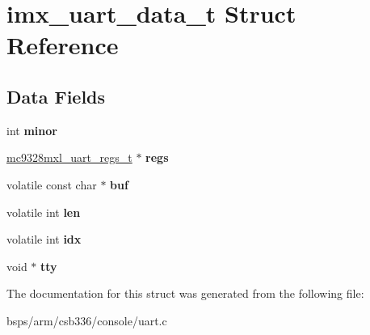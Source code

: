 \hypertarget{structimx__uart__data__t}{}\section{imx\+\_\+uart\+\_\+data\+\_\+t Struct Reference}
\label{structimx__uart__data__t}
\subsection*{Data Fields}
\begin{DoxyCompactItemize}
\item 
\mbox{\label{structimx__uart__data__t_a5329b57ac930b124fdaf34b22572b4e4}} 
int {\bfseries minor}
\item 
\mbox{\label{structimx__uart__data__t_a13bff1061bfa4ee0696477ef9d562e70}} 
\mbox{\hyperlink{structmc9328mxl__uart__regs__t}{mc9328mxl\+\_\+uart\+\_\+regs\+\_\+t}} $\ast$ {\bfseries regs}
\item 
\mbox{\label{structimx__uart__data__t_af8541799d7591bd41c897a14ad0b21ae}} 
volatile const char $\ast$ {\bfseries buf}
\item 
\mbox{\label{structimx__uart__data__t_a7ae7f01abf1b3db5e89b8d3aae6e1abd}} 
volatile int {\bfseries len}
\item 
\mbox{\label{structimx__uart__data__t_a4f73e22f69dd97d075631262f2da3dbd}} 
volatile int {\bfseries idx}
\item 
\mbox{\label{structimx__uart__data__t_a435297c0897a9d2b2a06a1c0bcc007fd}} 
void $\ast$ {\bfseries tty}
\end{DoxyCompactItemize}


The documentation for this struct was generated from the following file\+:\begin{DoxyCompactItemize}
\item 
bsps/arm/csb336/console/uart.\+c\end{DoxyCompactItemize}
